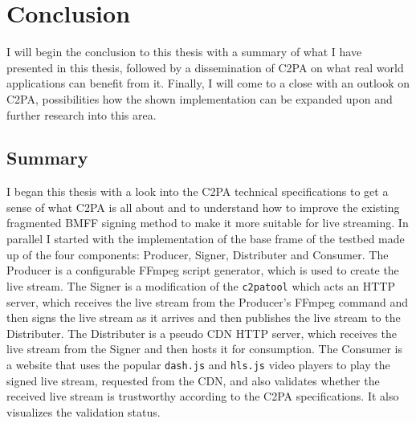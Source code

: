 \chapter{Conclusion\label{cha:chapter7}}

I will begin the conclusion to this thesis with a summary of what I have presented in this thesis, followed by a dissemination of C2PA on what real world applications can benefit from it. Finally, I will come to a close with an outlook on C2PA, possibilities how the shown implementation can be expanded upon and further research into this area.

\section{Summary\label{sec:summary}}

I began this thesis with a look into the C2PA technical specifications to get a sense of what C2PA is all about and to understand how to improve the existing fragmented BMFF signing method to make it more suitable for live streaming. In parallel I started with the implementation of the base frame of the testbed made up of the four components: Producer, Signer, Distributer and Consumer. The Producer is a configurable FFmpeg script generator, which is used to create the live stream. The Signer is a modification of the \texttt{c2patool} which acts an HTTP server, which receives the live stream from the Producer's FFmpeg command and then signs the live stream as it arrives and then publishes the live stream to the Distributer. The Distributer is a pseudo CDN HTTP server, which receives the live stream from the Signer and then hosts it for consumption. The Consumer is a website that uses the popular \texttt{dash.js} and \texttt{hls.js} video players to play the signed live stream, requested from the CDN, and also validates whether the received live stream is trustworthy according to the C2PA specifications. It also visualizes the validation status.


